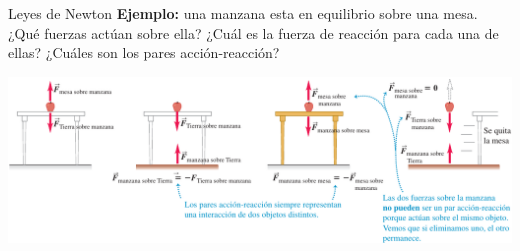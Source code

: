 \documentclass[9pt, aspectratio=169]{beamer}
\begin{document}
\begin{frame}{Leyes de Newton}
    \textbf{Ejemplo:} una manzana esta en equilibrio sobre una mesa. ¿Qué fuerzas actúan sobre ella? ¿Cuál es la fuerza de reacción para cada una de ellas? ¿Cuáles son los pares acción-reacción?

    \begin{center}
        \includegraphics[scale=0.5]{figs/fig-12.png}
    \end{center}
\end{frame}
\end{document}
